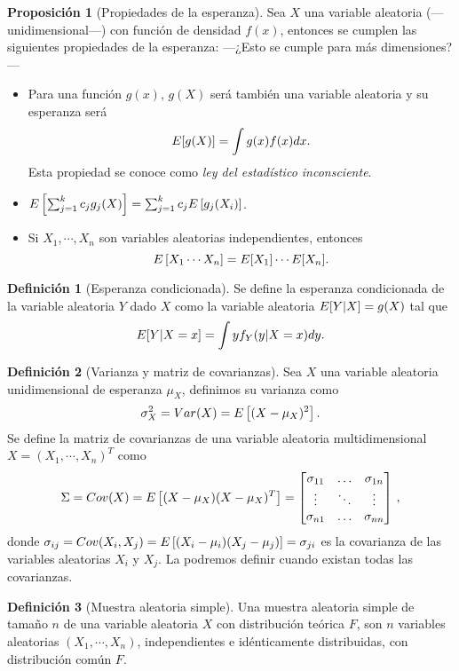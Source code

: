 \documentclass[10pt,a4paper]{article} %
\let\mathbb\relax
\theoremstyle{definition}
\newtheorem{definition}{Definición}[section]
\newtheorem{proposition}[theorem]{Proposición}
\begin{document}
\begin{proposition}[Propiedades de la esperanza]
  Sea $X$ una variable aleatoria  (---unidimensional---) con función de densidad $f(x)$, entonces se cumplen las siguientes propiedades de la esperanza:
---¿Esto se cumple para más dimensiones?---
  \begin{itemize}
  \item Para una función $g(x)$, $g(X)$ será también una variable aleatoria y su esperanza será\[
\mathbb{E}[g(X)] = \int g(x)f(x)dx.
\]
Esta propiedad se conoce como \textit{ley del estadístico inconsciente}.
\item $\mathbb{E}\left [\sum_{j=1}^kc_jg_j(X) \right] = \sum_{j=1}^k c_j \mathbb{E} \left [ g_j(X_i) \right ]$.

\item Si $X_1,\cdots,X_n$ son variables aleatorias independientes, entonces\[
\mathbb{E} \left [ X_1 \cdots X_n \right ] = \mathbb{E}[X_1] \cdots \mathbb{E}[X_n].
  \]
  \end{itemize}
  
\end{proposition}
\begin{definition}[Esperanza condicionada]
  Se define la esperanza condicionada de la variable aleatoria $Y$ dado $X$ como la variable aleatoria $\mathbb{E}[Y|X] = g(X)$ tal que \[
\mathbb{E} [ Y | X = x ] = \int y f_Y(y| X = x) dy.
  \] 
  
\end{definition}
\begin{definition}[Varianza y matriz de covarianzas]
  Sea $X$ una variable aleatoria unidimensional de esperanza $\mu_X$, definimos su varianza como\[
\sigma_X^2 = Var(X) = \mathbb{E}\left [ (X- \mu_X)^2 \right ].
  \]
  Se define la matriz de covarianzas de una variable aleatoria multidimensional $X= (X_1,\cdots,X_n)^T$ como\[
\Sigma = Cov(X) = \mathbb{E}\left [(X-\mu_X)(X-\mu_X)^T \right ] =  \begin{bmatrix} \sigma_{11} & \dots & \sigma_{1n} \\ \vdots& \ddots & \vdots \\ \sigma_{n1} &  \dots & \sigma_{nn}\end{bmatrix}\,,
\]
donde $\sigma_{ij} = Cov(X_i, X_j) = \mathbb{E}\left[(X_i-\mu_i)(X_j-\mu_j)\right]=\sigma_{ji}$ es la covarianza de las variables aleatorias $X_i$ y $X_j$. La podremos definir cuando existan todas las covarianzas.  
\end{definition}

\begin{definition}[Muestra aleatoria simple]
  Una muestra aleatoria simple de tamaño $n$ de una variable aleatoria $X$ con distribución teórica $F$, son $n$ variables aleatorias $(X_1,\cdots,X_n)$, independientes e idénticamente distribuidas, con distribución común $F$.
\end{definition}
\end{document}

